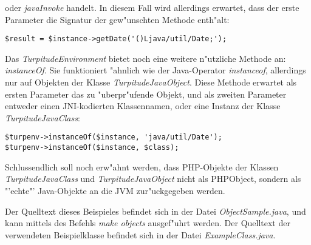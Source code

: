 oder \emph{javaInvoke} handelt. In diesem Fall wird allerdings erwartet, dass der erste Parameter
die Signatur der gew"unschten Methode enth"alt:
\begin{lstlisting}[caption=direkter Methodenaufruf]
$result = $instance->getDate('()Ljava/util/Date;');
\end{lstlisting}
Das \emph{TurpitudeEnvironment} bietet noch eine weitere n"utzliche Methode an: \emph{instanceOf}.
Sie funktioniert "ahnlich wie der Java-Operator \emph{instanceof}, allerdings nur
auf Objekten der Klasse \emph{TurpitudeJavaObject}. Diese Methode erwartet als ersten Parameter
das zu "uberpr"ufende Objekt, und als zweiten Parameter entweder einen JNI-kodierten Klassennamen,
oder eine Instanz der Klasse \emph{TurpitudeJavaClass}:
\begin{lstlisting}[caption=instanceOf]
$turpenv->instanceOf($instance, 'java/util/Date');
$turpenv->instanceOf($instance, $class);
\end{lstlisting}
Schlussendlich soll noch erw"ahnt werden, dass PHP-Objekte der Klassen
\emph{TurpitudeJavaClass} und \emph{TurpitudeJavaObject} nicht als PHPObject, sondern als "'echte"'
Java-Objekte an die JVM zur"uckgegeben werden.

Der Quelltext dieses Beispieles befindet sich in der Datei \emph{ObjectSample.java}, 
und kann mittels des Befehls \emph{make objects} ausgef"uhrt werden. Der Quelltext der
verwendeten Beispielklasse befindet sich in der Datei \emph{ExampleClass.java}.

